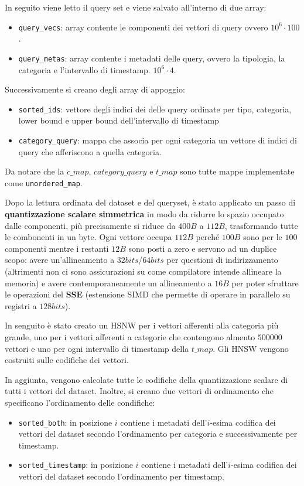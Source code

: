 In seguito viene letto il query set e viene salvato all'interno di due array:
\begin{itemize}
    \item \texttt{query\_vecs}: array contente le componenti dei vettori di query ovvero 
    $10^6 \cdot 100$.
    \item \texttt{query\_metas}: array contente i metadati delle query, ovvero la tipologia,
    la categoria e l'intervallo di timestamp.
    $10^6 \cdot 4$.
\end{itemize}

Successivamente si creano degli array di appoggio:
\begin{itemize}
    \item \texttt{sorted\_ids}: vettore degli indici dei delle query ordinate per tipo, 
    categoria, lower bound e upper bound dell'intervallo di timestamp
    \item \texttt{category\_query}: mappa che associa per ogni categoria un vettore di 
    indici di query che afferiscono a quella categoria.
\end{itemize}

Da notare che la $c\_map$, $category\_query$ e $t\_map$ sono tutte mappe implementate 
come \texttt{unordered\_map}.

Dopo la lettura ordinata del dataset e del queryset, è stato applicato un passo di 
\textbf{quantizzazione scalare simmetrica} in modo da ridurre lo spazio occupato dalle componenti, 
più precisamente si riduce da $400B$ a $112B$, trasformando tutte le combonenti in 
un byte. Ogni vettore occupa $112B$ perché $100B$ sono per le $100$ componenti mentre i restanti $12B$
sono posti a zero e servono ad un duplice scopo: avere un'allineamento a $32bits$/$64bits$ per questioni
di indirizzamento (altrimenti non ci sono assicurazioni su come compilatore intende allineare la memoria)
e avere contemporaneamente un allineamento a $16B$ per poter sfruttare le operazioni del \textbf{SSE} (estensione SIMD
che permette di operare in parallelo su registri a $128bits$).

In senguito è stato creato un HSNW per i vettori 
afferenti alla categoria più grande, uno per i vettori afferenti a categorie che 
contengono almento $500000$ vettori e uno per ogni intervallo di timestamp della 
$t\_map$. Gli HNSW vengono costruiti sulle codifiche dei vettori.

In aggiunta, vengono calcolate tutte le codifiche della quantizzazione scalare 
di tutti i vettori del dataset. Inoltre, si creano due vettori di ordinamento 
che specificano l'ordinamento delle condifiche:
\begin{itemize}
    \item \texttt{sorted\_both}: in posizione $i$ contiene i metadati dell'$i$-esima
    codifica dei vettori del dataset secondo l'ordinamento per categoria e successivamente
    per timestamp.
    \item \texttt{sorted\_timestamp}: in posizione $i$ contiene i metadati dell'$i$-esima
    codifica dei vettori del dataset secondo l'ordinamento per timestamp.
\end{itemize}

